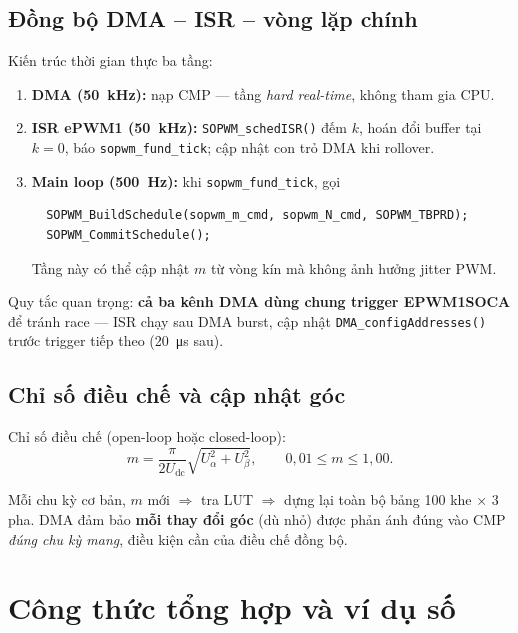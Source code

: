 \documentclass[12pt,a4paper]{article}
\begin{document}
\subsection{Đồng bộ DMA -- ISR -- vòng lặp chính}

Kiến trúc thời gian thực ba tầng:

\begin{enumerate}
  \item \textbf{DMA (\SI{50}{\kilo\hertz}):} nạp CMP --- tầng \emph{hard real-time}, không tham gia CPU.
  \item \textbf{ISR ePWM1 (\SI{50}{\kilo\hertz}):} \texttt{SOPWM\_schedISR()} đếm $k$, hoán đổi buffer tại $k=0$, báo \texttt{sopwm\_fund\_tick}; cập nhật con trỏ DMA khi rollover.
  \item \textbf{Main loop (\SI{500}{\hertz}):} khi \texttt{sopwm\_fund\_tick}, gọi
  \begin{verbatim}
  SOPWM_BuildSchedule(sopwm_m_cmd, sopwm_N_cmd, SOPWM_TBPRD);
  SOPWM_CommitSchedule();
  \end{verbatim}
  Tầng này có thể cập nhật $m$ từ vòng kín mà không ảnh hưởng jitter PWM.
\end{enumerate}

Quy tắc quan trọng: \textbf{cả ba kênh DMA dùng chung trigger EPWM1SOCA} để tránh race --- ISR chạy sau DMA burst, cập nhật \texttt{DMA\_configAddresses()} trước trigger tiếp theo (\SI{20}{\micro\second} sau).

\subsection{Chỉ số điều chế và cập nhật góc}

Chỉ số điều chế (open-loop hoặc closed-loop):
\begin{equation}
  m = \frac{\pi}{2U_{\mathrm{dc}}}\sqrt{U_\alpha^2 + U_\beta^2},
  \qquad 0{,}01 \le m \le 1{,}00.
  \label{eq:m_index}
\end{equation}

Mỗi chu kỳ cơ bản, $m$ mới $\Rightarrow$ tra LUT $\Rightarrow$ dựng lại toàn bộ bảng 100 khe $\times$ 3 pha. DMA đảm bảo \textbf{mỗi thay đổi góc} (dù nhỏ) được phản ánh đúng vào CMP \emph{đúng chu kỳ mang}, điều kiện cần của điều chế đồng bộ.



\section{Công thức tổng hợp và ví dụ số}
\end{document}
